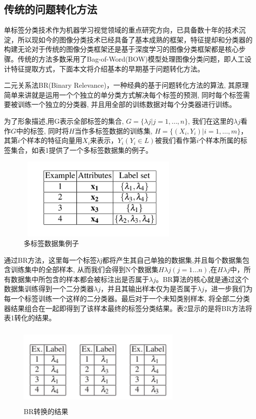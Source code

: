 \subsection{传统的问题转化方法}
单标签分类技术作为机器学习视觉领域的重点研究方向，已具备数十年的技术沉淀，所以现如今的图像分类技术已经具备了基本成熟的框架，特征提却和分类器的构建无论对于传统的图像分类框架还是基于深度学习的图像分类框架都是核心步骤。传统的方法多数采用了Bag-of-Word(BOW)模型处理图像分类问题，即人工设计特征提取方式，下面本文将介绍基本的早期基于问题转化方法。

二元关系法BR(Binary Relevance)，一种经典的基于问题转化方法的算法, 其原理简单来讲就是运用一个个独立的单分类方式解决每个标签的预测, 同时每个标签需要被训练一个独立的分类器, 并且用全部的训练数据对每个分类器进行训练。

为了形象描述,用G表示全部标签的集合, $G=\{\lambda j|j=1, …, n\}$, 我们在这里的$\lambda j$看作$G$中的标签, 同时将$H$当作多标签数据的训练集, $H=\{ (X_i, Y_i) |i=1, …, m\}$，其第$i$个样本的特征向量用$X_i$来表示，$Y_i (Y_i\in L) $被我们看作第$i$个样本所属的标签集合，如表1提供了一个多标签数据集的例子。

\begin{figure}[htbp!]
	\centering
	\includegraphics[width=8cm, height=4cm]{figures/p2-1.png}
	\caption{多标签数据集例子}\label{fig:p2-1}
	\vspace{-1em}
\end{figure}

通过BR方法，这里每一个标签λj都将产生其自己单独的数据集,并且每个数据集包含训练集中的全部样本, 从而我们会得到N个数据集$H\lambda j (j=1…n)$,在$H\lambda j$中，所有数据集中所包含的样本都会被标注出是否属于$\lambda j$。BR算法的核心就是通过这个数据集训练得到一个二分类器$\lambda j$，并且其输出样本仅为是否属于$\lambda j$，进一步我们为每一个标签训练一个这样的二分类器。最后对于一个未知类别样本, 将全部二分类器结果组合在一起即得到了该样本最终的标签分类结果。表2显示的是将BR方法将表1转化的结果。

\begin{figure}[htbp!]
	\centering
	\includegraphics[width=8cm, height=4cm]{figures/p2-2.png}
	\caption{BR转换的结果}\label{fig:p2-2}
	\vspace{-1em}
\end{figure}

